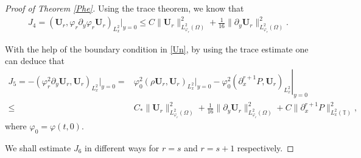 \documentclass[10pt,a4paper]{amsart}
\begin{document}
\begin{proof}[Proof of Theorem \ref{Phe}]
Using the trace theorem, we know that
\begin{align*}
J_{4}
=(\mathbf{U}_{r},\varphi_{r}\partial_{y}\varphi_{r}\mathbf{U}_{r})_{L_{x}^{2}}|_{y=0}
\leq C\|\mathbf{U}_{r}\|_{L_{\varphi_{r}}^{2}(\Omega)}^{2}
     +\frac{1}{16}\|\partial_{y}\mathbf{U}_{r}\|_{L_{\varphi_{r}}^{2}(\Omega)}^{2}.
\end{align*}


With the help of the boundary condition in \eqref{Un}, by using the trace estimate one can deduce that
\begin{align*}
J_{5}
=-(\varphi_{r}^{2}\partial_{y}\mathbf{U}_{r},\mathbf{U}_{r})_{L_{x}^{2}}|_{y=0}
=& \varphi_{0}^{2}(\rho \mathbf{U}_{r},\mathbf{U}_{r})_{L_{x}^{2}}|_{y=0}
  -\left.\varphi_{0}^{2}(\partial_{x}^{r+1}P,\mathbf{U}_{r})_{L_{x}^{2}}\right|_{y=0}\\
\leq& C_{*}\|\mathbf{U}_{r}\|_{L_{\varphi_{r}}^{2}(\Omega)}^{2}
     +\frac{1}{16}\|\partial_{y}\mathbf{U}_{r}\|_{L_{\varphi_{r}}^{2}(\Omega)}^{2}
     +C\|\partial_{x}^{r+1}P\|_{L_{x}^{2}(\mathbb{T})}^{2},
\end{align*}
where $\varphi_{0}=\varphi(t,0)$.

We shall estimate $J_{6}$ in different ways for $r=s$ and $r=s+1$ respectively.


\end{proof}
\end{document}
